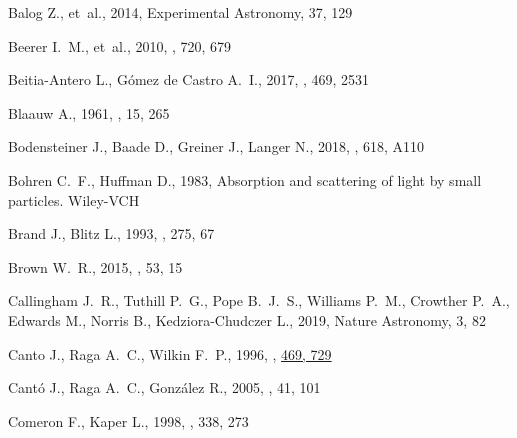 \documentclass[useAMS, usenatbib, a4paper]{mnras}
\begin{document}
\begin{thebibliography}{}
{Balog} Z.,  et~al., 2014, Experimental Astronomy, 37, 129

{Beerer} I.~M.,  et~al., 2010, \apj, 720, 679

{Beitia-Antero} L.,  {Gómez de Castro} A.~I.,  2017, \mnras, 469, 2531

{Blaauw} A.,  1961, \bain, 15, 265

{Bodensteiner} J.,  {Baade} D.,  {Greiner} J.,   {Langer} N.,  2018, \aap, 618,
  A110

Bohren C.~F.,  Huffman D.,  1983, Absorption and scattering of light by small
  particles.
Wiley-VCH

{Brand} J.,  {Blitz} L.,  1993, \aap, 275, 67

{Brown} W.~R.,  2015, \araa, 53, 15

{Callingham} J.~R.,  {Tuthill} P.~G.,  {Pope} B.~J.~S.,  {Williams} P.~M.,
  {Crowther} P.~A.,  {Edwards} M.,  {Norris} B.,   {Kedziora-Chudczer} L.,
  2019, Nature Astronomy, 3, 82

{Canto} J.,  {Raga} A.~C.,   {Wilkin} F.~P.,  1996, , \href {http://adsabs.harvard.edu/abs/1996ApJ...469..729C}
  {469, 729}

{Cantó} J.,  {Raga} A.~C.,   {González} R.,  2005, \rmxaa, 41, 101

{Comeron} F.,  {Kaper} L.,  1998, \aap, 338, 273


\end{thebibliography}
\end{document}

